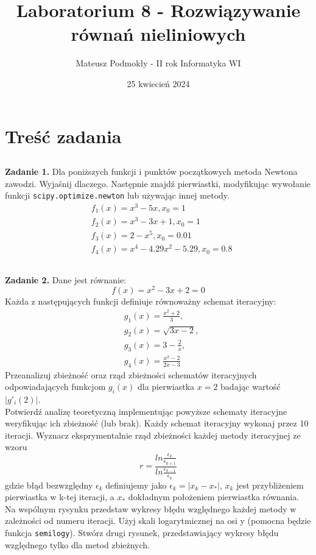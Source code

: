 \documentclass[11pt]{scrartcl}
\title{Laboratorium 8 - Rozwiązywanie równań nieliniowych}
\author{Mateusz Podmokły - II rok Informatyka WI}
\date{25 kwiecień 2024}
\begin{document}
    \maketitle
    \section{Treść zadania}
    \subsection*{}
    \textbf{Zadanie 1.}
    Dla poniższych funkcji i punktów początkowych metoda
    Newtona zawodzi. Wyjaśnij dlaczego. Następnie znajdź
    pierwiastki, modyfikując wywołanie funkcji
    \texttt{scipy.optimize.newton} lub używając innej
    metody.
    \begin{align*}
        &f_1(x)=x^3-5x,x_0=1 \\
        &f_2(x)=x^3-3x+1,x_0=1 \\
        &f_3(x)=2-x^5,x_0=0.01 \\
        &f_4(x)=x^4-4.29x^2-5.29,x_0=0.8
    \end{align*}

    \subsection*{}
    \textbf{Zadanie 2.} Dane jest równanie:
    \[
        f(x)=x^2-3x+2=0
    \]
    Każda z następujących funkcji definiuje równoważny
    schemat iteracyjny:
    \begin{align*}
        &g_1(x)=\frac{x^2+2}{3}, \\
        &g_2(x)=\sqrt{3x-2}, \\
        &g_3(x)=3-\frac{2}{x}, \\
        &g_4(x)=\frac{x^2-2}{2x-3}
    \end{align*}
    Przeanalizuj zbieżność oraz rząd zbieżności schematów
    iteracyjnych odpowiadających funkcjom $g_i(x)$ dla
    pierwiastka $x=2$ badając wartość $|g'_i(2)|$. \\
    Potwierdź analizę teoretyczną implementując powyższe
    schematy iteracyjne weryﬁkując ich zbieżność (lub brak).
    Każdy schemat iteracyjny wykonaj przez 10 iteracji.
    Wyznacz eksprymentalnie rząd zbieżności każdej metody
    iteracyjnej ze wzoru
    \[
        r=\frac{ln\frac{\epsilon_k}{\epsilon_{k+1}}}
            {ln\frac{\epsilon_{k-1}}{\epsilon_k}}
    \]
    gdzie błąd bezwzględny $\epsilon_k$ definiujemy jako
    $\epsilon_k=|x_k-x_*|$, $x_k$ jest przybliżeniem
    pierwiastka w k-tej iteracji, a $x_*$ dokładnym
    położeniem pierwiastka równania. \\
    Na wspólnym rysynku przedstaw wykresy błędu względnego
    każdej metody w zależności od numeru iteracji. Użyj
    skali logarytmicznej na osi y (pomocna będzie funkcja
    \texttt{semilogy}). Stwórz drugi rysunek, przedstawiający
    wykresy błędu względnego tylko dla metod zbieżnych.
\end{document}
